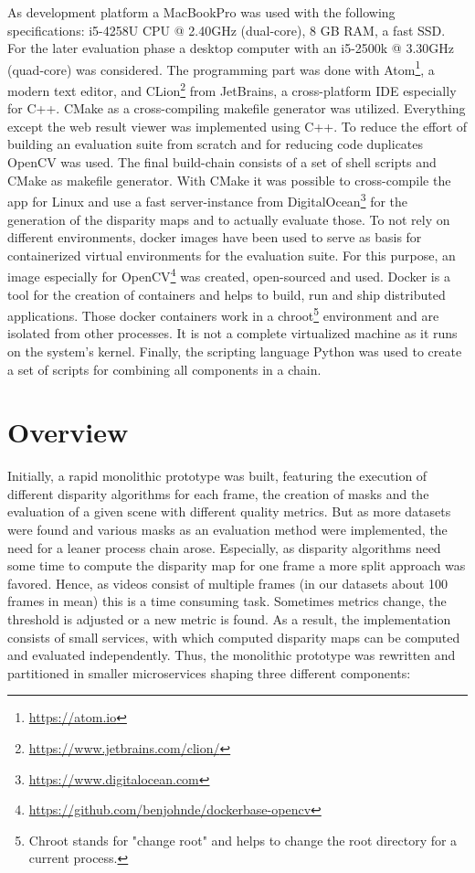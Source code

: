 As development platform a MacBookPro was used with the following specifications: i5-4258U CPU @ 2.40GHz (dual-core), 8 GB RAM, a fast SSD.
For the later evaluation phase a desktop computer with an i5-2500k @ 3.30GHz (quad-core) was considered.
The programming part was done with Atom\footnote{\url{https://atom.io}}, a modern text editor, and CLion\footnote{\url{https://www.jetbrains.com/clion/}} from JetBrains, a cross-platform IDE especially for C++.
CMake as a cross-compiling makefile generator was utilized.
Everything except the web result viewer was implemented using C++.
To reduce the effort of building an evaluation suite from scratch and for reducing code duplicates OpenCV was used.
The final build-chain consists of a set of shell scripts and CMake as makefile generator.
With CMake it was possible to cross-compile the app for Linux and use a fast server-instance from DigitalOcean\footnote{\url{https://www.digitalocean.com}} for the generation of the disparity maps and to actually evaluate those.
\newline\newline\noindent To not rely on different environments, docker images have been used to serve as basis for containerized virtual environments for the evaluation suite.
For this purpose, an image especially for OpenCV\footnote{\url{https://github.com/benjohnde/dockerbase-opencv}} was created, open-sourced and used.
Docker is a tool for the creation of containers and helps to build, run and ship distributed applications.
Those docker containers work in a chroot\footnote{Chroot stands for "change root" and helps to change the root directory for a current process.} environment and are isolated from other processes.
It is not a complete virtualized machine as it runs on the system's kernel.
Finally, the scripting language Python was used to create a set of scripts for combining all components in a chain.

\section{Overview}

Initially, a rapid monolithic prototype was built, featuring the execution of different disparity algorithms for each frame, the creation of masks and the evaluation of a given scene with different quality metrics.
But as more datasets were found and various masks as an evaluation method were implemented, the need for a leaner process chain arose.
Especially, as disparity algorithms need some time to compute the disparity map for one frame a more split approach was favored.
Hence, as videos consist of multiple frames (in our datasets about 100 frames in mean) this is a time consuming task.
Sometimes metrics change, the threshold is adjusted or a new metric is found.
As a result, the implementation consists of small services, with which computed disparity maps can be computed and evaluated independently.
Thus, the monolithic prototype was rewritten and partitioned in smaller microservices shaping three different components:

